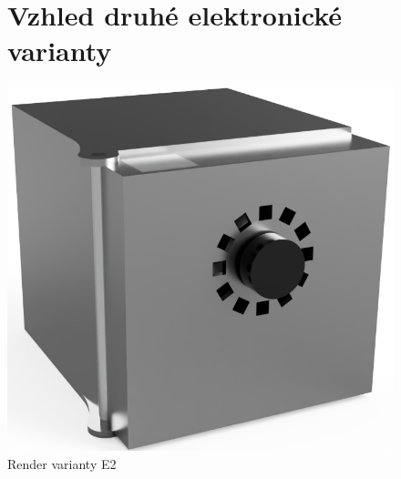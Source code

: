 \newcommand\OdsazeniNadpisu{12mm}

\begin{figure}
	\section{Vzhled druhé elektronické varianty}
    \vspace{\OdsazeniNadpisu}
    \centering
    \includegraphics[width=\textwidth]{kapitoly/obrazky/E2/predni_render.png}
    \caption{Render varianty E2}
    \label{fig:E2-render}
\end{figure}


